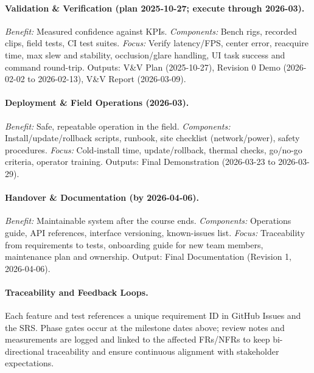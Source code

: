 \documentclass[12pt]{article}
\newcommand{\lips}{\textit{Insert your content here.}}
\begin{document}
\paragraph{Validation \& Verification (plan 2025-10-27; execute through 2026-03).}
\emph{Benefit:} Measured confidence against KPIs.  
\emph{Components:} Bench rigs, recorded clips, field tests, CI test suites.  
\emph{Focus:} Verify latency/FPS, center error, reacquire time, max slew and stability, occlusion/glare handling, UI task success and command round-trip. Outputs: V\&V Plan (2025-10-27), Revision 0 Demo (2026-02-02 to 2026-02-13), V\&V Report (2026-03-09).

\paragraph{Deployment \& Field Operations (2026-03).}
\emph{Benefit:} Safe, repeatable operation in the field.  
\emph{Components:} Install/update/rollback scripts, runbook, site checklist (network/power), safety procedures.  
\emph{Focus:} Cold-install time, update/rollback, thermal checks, go/no-go criteria, operator training. Outputs: Final Demonstration (2026-03-23 to 2026-03-29).

\paragraph{Handover \& Documentation (by 2026-04-06).}
\emph{Benefit:} Maintainable system after the course ends.  
\emph{Components:} Operations guide, API references, interface versioning, known-issues list.  
\emph{Focus:} Traceability from requirements to tests, onboarding guide for new team members, maintenance plan and ownership. Output: Final Documentation (Revision 1, 2026-04-06).

\paragraph{Traceability and Feedback Loops.}
Each feature and test references a unique requirement ID in GitHub Issues and the SRS. Phase gates occur at the milestone dates above; review notes and measurements are logged and linked to the affected FRs/NFRs to keep bi-directional traceability and ensure continuous alignment with stakeholder expectations.

\end{document}

